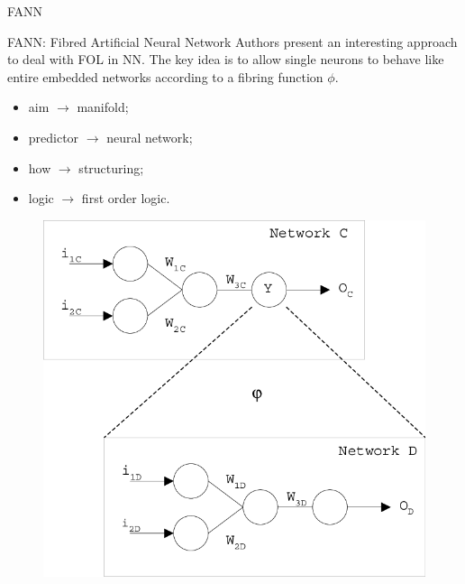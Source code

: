 \documentclass[presentation]{beamer}\mode<presentation>{\usetheme{AMSBolognaFC}}
\begin{document}
\begin{frame}[allowframebreaks]{FANN}
    \begin{block}{FANN: Fibred Artificial Neural Network }
        Authors present an interesting approach to deal with FOL in NN.
        The key idea is to allow single neurons to behave like entire embedded networks according to a fibring function $\phi$.
        \begin{itemize}
            \item aim $\rightarrow$ manifold;
            \item predictor $\rightarrow$ neural network;
            \item how $\rightarrow$ structuring;
            \item logic $\rightarrow$ first order logic.
        \end{itemize}        
    \end{block}
    
    \framebreak
    
    \begin{figure}
        \centering
        \includegraphics[height=0.8\textheight]{figures/fibring-example.png}
    \end{figure}

\end{frame}
\end{document}
